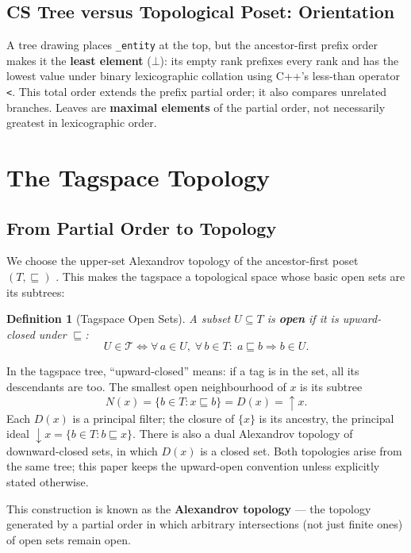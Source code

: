\documentclass{article}
\newtheorem{definition}{Definition}[section]
\begin{document}
\subsection{CS Tree versus Topological Poset: Orientation}

A tree drawing places \texttt{\_entity} at the top, but the ancestor-first
prefix order makes it the \textbf{least element} ($\bot$): its empty rank
prefixes every rank and has the lowest value under binary lexicographic
collation using C++'s less-than operator \texttt{<}. This total order extends
the prefix partial order; it also compares unrelated branches. Leaves are
\textbf{maximal elements} of the partial order, not necessarily greatest in
lexicographic order.

\section{The Tagspace Topology}\label{sec:topology}

\subsection{From Partial Order to Topology}

We choose the upper-set Alexandrov topology of the ancestor-first poset
$(T, \sqsubseteq)$ \cite{alexandrov}. This makes the tagspace a
topological space whose basic open sets are its subtrees:

\begin{definition}[Tagspace Open Sets]
A subset $U \subseteq T$ is \textbf{open} if it is upward-closed under
$\sqsubseteq$:
\[
  U \in \mathcal{T}
  \iff
  \forall\, a \in U,\; \forall\, b \in T :\;
  a \sqsubseteq b \Rightarrow b \in U.
\]
\end{definition}

In the tagspace tree, ``upward-closed'' means: if a tag is in the set, all
its descendants are too. The smallest open neighbourhood of $x$ is its subtree
\[
 N(x)=\{b\in T:x\sqsubseteq b\}=D(x)=\uparrow\!x.
\]
Each $D(x)$ is a principal filter; the closure of $\{x\}$ is its ancestry,
the principal ideal $\downarrow\!x=\{b\in T:b\sqsubseteq x\}$.
There is also a dual Alexandrov topology of downward-closed sets, in which
$D(x)$ is a closed set. Both topologies arise from the same tree; this
paper keeps the upward-open convention unless explicitly stated otherwise.

This construction is known as the \textbf{Alexandrov topology} --- the topology
generated by a partial order in which arbitrary intersections (not just finite
ones) of open sets remain open.
\end{document}
